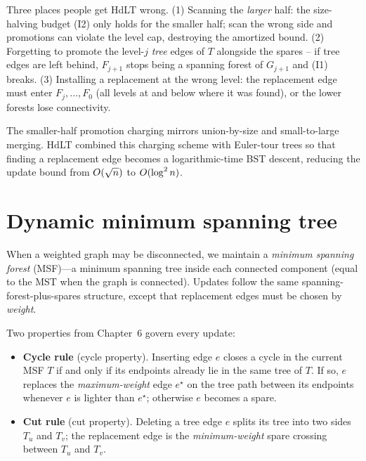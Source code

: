 \begin{trapbox}
Three places people get HdLT wrong. (1) Scanning the \emph{larger} half: the
size-halving budget (I2) only holds for the smaller half; scan the wrong side and
promotions can violate the level cap, destroying the amortized bound. (2)
Forgetting to promote the level-$j$ \emph{tree} edges of $T$ alongside the
spares -- if tree edges are left behind, $F_{j+1}$ stops being a spanning forest
of $G_{j+1}$ and (I1) breaks. (3) Installing a replacement at the wrong level: the
replacement edge must enter $F_j,\dots,F_0$ (all levels at and below where it was
found), or the lower forests lose connectivity.
\end{trapbox}

\begin{marginnotebox}
The smaller-half promotion charging mirrors union-by-size and small-to-large merging. HdLT combined this charging scheme with Euler-tour trees so that finding a replacement edge becomes a logarithmic-time BST descent, reducing the update bound from $O(\sqrt n)$ to $O(\log^2 n)$.
\end{marginnotebox}

\section{Dynamic minimum spanning tree}
\label{ch39:dynamic-mst}

When a weighted graph may be disconnected, we maintain a \emph{minimum spanning forest}
(MSF)---a minimum spanning tree inside each connected component (equal to the MST when
the graph is connected). Updates follow the same spanning-forest-plus-spares structure,
except that replacement edges must be chosen by \emph{weight}.

\begin{intuitionbox}
Two properties from Chapter~6 govern every update:
\begin{itemize}
  \item \textbf{Cycle rule} (cycle property). Inserting edge $e$ closes a cycle in the
        current MSF $T$ if and only if its endpoints already lie in the same tree of
        $T$. If so, $e$ replaces the \emph{maximum-weight} edge $e^\star$ on the tree
        path between its endpoints whenever $e$ is lighter than $e^\star$; otherwise
        $e$ becomes a spare.
  \item \textbf{Cut rule} (cut property). Deleting a tree edge $e$ splits its tree into
        two sides $T_u$ and $T_v$; the replacement edge is the \emph{minimum-weight}
        spare crossing between $T_u$ and $T_v$.
\end{itemize}
\end{intuitionbox}

